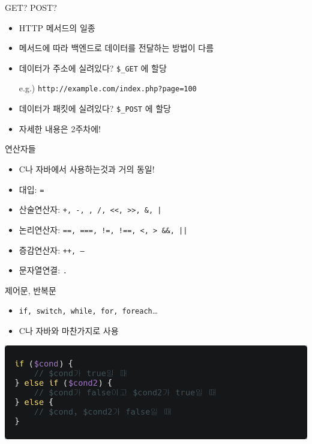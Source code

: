 \documentclass{beamer}
\begin{document}
    \begin{frame}{GET? POST?}
        \begin{itemize}
            \item HTTP 메서드의 일종
            \item 메서드에 따라 백엔드로 데이터를 전달하는 방법이 다름
            \item 데이터가 주소에 실려있다? \texttt{\$\_GET} 에 할당
            
            e.g.) \texttt{http://example.com/index.php?page=100}
            \item 데이터가 패킷에 실려있다? \texttt{\$\_POST} 에 할당
            \item 자세한 내용은 2주차에!
        \end{itemize}
    \end{frame}

    \begin{frame}{연산자들}
        \begin{itemize}
            \item C나 자바에서 사용하는것과 거의 동일!
            
            \item 대입: \texttt{=}
            \item 산술연산자: \texttt{+, -, \*, /, <<, >>, \&, |}
            \item 논리연산자: \texttt{==, ===, !=, !==, <, > \&\&, ||}
            \item 증감연산자: \texttt{++, --}
            \item 문자열연결: \texttt{.}
        \end{itemize}
    \end{frame}

    \begin{frame}{제어문, 반복문}
        \begin{itemize}
            \item \texttt{if, switch, while, for, foreach}\dots
            \item C나 자바와 마찬가지로 사용
        \end{itemize}
        \begin{center}
            \includegraphics[height=0.45\textheight]{Images/php11.png}
        \end{center}
    \end{frame}
\end{document}
